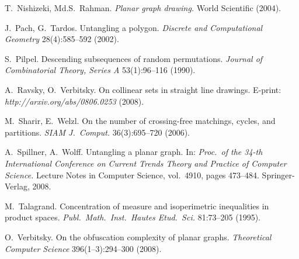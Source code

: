 \documentclass[reqno,12pt]{amsart}
\begin{document}
\begin{thebibliography}{10}
T.~Nishizeki, Md.S.~Rahman.
\newblock
{\it Planar graph drawing.}
\newblock
World Scientific (2004).

J.~Pach, G.~Tardos.
\newblock
Untangling a polygon. 
\newblock
{\it Discrete and Computational Geometry\/} 28(4):585--592 (2002).

S.~Pilpel. 
\newblock
Descending subsequences of random permutations.
\newblock
{\em Journal of Combinatorial Theory, Series A} 
53(1):96--116 (1990).

A.~Ravsky, O.~Verbitsky.
\newblock
On collinear sets in straight line drawings.
\newblock
E-print: {\sl http://arxiv.org/abs/0806.0253} (2008).

M.~Sharir, E.~Welzl.
\newblock
On the number of crossing-free matchings, cycles, and partitions.
\newblock
{\em SIAM J.\ Comput.} 36(3):695--720 (2006).

A.~Spillner, A.~Wolff.
\newblock
Untangling a planar graph.
\newblock
In: 
{\it Proc.\ of the 34-th International Conference on Current 
Trends Theory and Practice of Computer Science.} 
Lecture Notes in Computer Science, vol.\ 4910, pages 473--484. 
Springer-Verlag, 2008.


M.~Talagrand.
\newblock
Concentration of measure and isoperimetric inequalities
in product spaces.
\newblock
{\em Publ.\ Math.\ Inst.\ Hautes Etud.\ Sci.} 81:73--205 (1995).

O.~Verbitsky.
\newblock
On the obfuscation complexity of planar graphs.
\newblock
{\it Theoretical Computer Science\/} 396(1--3):294--300 (2008).


\end{thebibliography}
\end{document}
